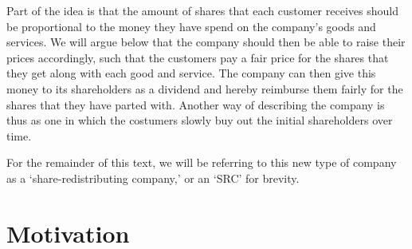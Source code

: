 \documentclass{article}
\begin{document}
Part of the idea is that the amount of shares that each customer receives should be proportional to the money they have spend on the company's goods and services. We will argue below that the company should then be able to raise their prices accordingly, such that the customers pay a fair price for the shares that they get along with each good and service. The company can then give this money to its shareholders as a dividend and hereby reimburse them fairly for the shares that they have parted with. 
%
Another way of describing the company is thus as one in which the costumers slowly buy out the initial shareholders over time.

For the remainder of this text, we will be referring to this new type of company as a `share-redistributing company,' or an `SRC' for brevity. 







\section{Motivation}
\end{document}
